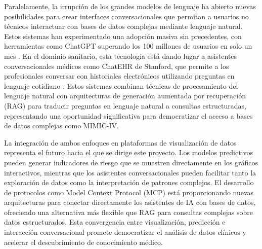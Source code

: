 Paralelamente, la irrupción de los grandes modelos de lenguaje ha abierto nuevas posibilidades para crear interfaces conversacionales que permitan a usuarios no técnicos interactuar con bases de datos complejas mediante lenguaje natural. Estos sistemas han experimentado una adopción masiva sin precedentes, con herramientas como ChatGPT superando los 100 millones de usuarios en solo un mes \cite{AcademyHealth2025_LLM}. En el dominio sanitario, esta tecnología está dando lugar a asistentes conversacionales médicos como ChatEHR de Stanford, que permite a los profesionales conversar con historiales electrónicos utilizando preguntas en lenguaje cotidiano \cite{Stanford2025_ChatEHR}. Estos sistemas combinan técnicas de procesamiento del lenguaje natural con arquitecturas de generación aumentada por recuperación (RAG) \cite{RAGSurvey2023} para traducir preguntas en lenguaje natural a consultas estructuradas, representando una oportunidad significativa para democratizar el acceso a bases de datos complejas como MIMIC-IV.

La integración de ambos enfoques en plataformas de visualización de datos representa el futuro hacia el que se dirige este proyecto. Los modelos predictivos pueden generar indicadores de riesgo que se muestren directamente en los gráficos interactivos, mientras que los asistentes conversacionales pueden facilitar tanto la exploración de datos como la interpretación de patrones complejos. El desarrollo de protocolos como Model Context Protocol (MCP) \cite{AnthropicMCP2024,MCPIntro2024} está proporcionando nuevas arquitecturas para conectar directamente los asistentes de IA con bases de datos, ofreciendo una alternativa más flexible que RAG para consultas complejas sobre datos estructurados. Esta convergencia entre visualización, predicción e interacción conversacional promete democratizar el análisis de datos clínicos y acelerar el descubrimiento de conocimiento médico.